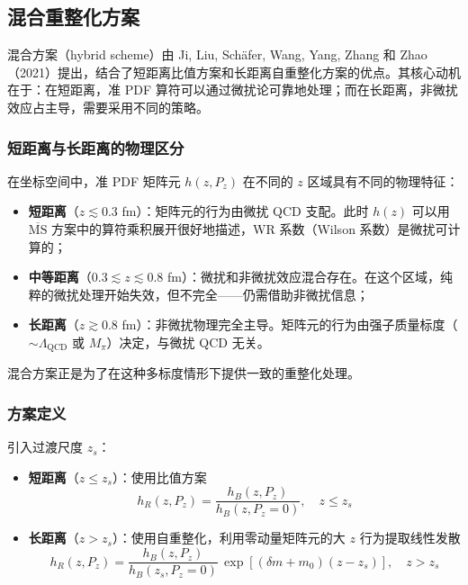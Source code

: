 \documentclass[11pt,a4paper]{ctexart}
\begin{document}
\subsection{混合重整化方案}

混合方案（hybrid scheme）由 Ji, Liu, Sch\"afer, Wang, Yang, Zhang 和 Zhao（2021）提出，结合了短距离比值方案和长距离自重整化方案的优点。其核心动机在于：在短距离，准 PDF 算符可以通过微扰论可靠地处理；而在长距离，非微扰效应占主导，需要采用不同的策略。

\subsubsection{短距离与长距离的物理区分}

在坐标空间中，准 PDF 矩阵元 $h(z, P_z)$ 在不同的 $z$ 区域具有不同的物理特征：
\begin{itemize}
  \item \textbf{短距离}（$z \lesssim 0.3$ fm）：矩阵元的行为由微扰 QCD 支配。此时 $h(z)$ 可以用 $\overline{\text{MS}}$ 方案中的算符乘积展开很好地描述，WR 系数（Wilson 系数）是微扰可计算的；
  \item \textbf{中等距离}（$0.3 \lesssim z \lesssim 0.8$ fm）：微扰和非微扰效应混合存在。在这个区域，纯粹的微扰处理开始失效，但不完全——仍需借助非微扰信息；
  \item \textbf{长距离}（$z \gtrsim 0.8$ fm）：非微扰物理完全主导。矩阵元的行为由强子质量标度（$\sim \Lambda_{\text{QCD}}$ 或 $M_\pi$）决定，与微扰 QCD 无关。
\end{itemize}

混合方案正是为了在这种多标度情形下提供一致的重整化处理。

\subsubsection{方案定义}

引入过渡尺度 $z_s$：
\begin{itemize}
  \item \textbf{短距离}（$z \le z_s$）：使用比值方案
  \begin{equation}
  h_R(z, P_z) = \frac{h_B(z, P_z)}{h_B(z, P_z=0)}, \quad z \le z_s
  \end{equation}
  \item \textbf{长距离}（$z > z_s$）：使用自重整化，利用零动量矩阵元的大 $z$ 行为提取线性发散
  \begin{equation}
  h_R(z, P_z) = \frac{h_B(z, P_z)}{h_B(z_s, P_z=0)} \,
  \exp\!\left[ (\delta m + m_0)(z - z_s) \right], \quad z > z_s
  \end{equation}
\end{itemize}
\end{document}
